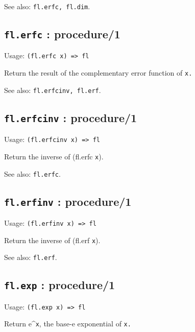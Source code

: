 \documentclass[
]{article}
\newcommand{\passthrough}[1]{#1}
\begin{document}
See also: \passthrough{\lstinline!fl.erfc, fl.dim!}.

\hypertarget{fl.erfc-procedure1-1}{%
\subsection{\texorpdfstring{\texttt{fl.erfc} :
procedure/1}{fl.erfc : procedure/1}}\label{fl.erfc-procedure1-1}}

Usage: \passthrough{\lstinline!(fl.erfc x) => fl!}

Return the result of the complementary error function of
\passthrough{\lstinline!x.!}

See also: \passthrough{\lstinline!fl.erfcinv, fl.erf!}.

\hypertarget{fl.erfcinv-procedure1-1}{%
\subsection{\texorpdfstring{\texttt{fl.erfcinv} :
procedure/1}{fl.erfcinv : procedure/1}}\label{fl.erfcinv-procedure1-1}}

Usage: \passthrough{\lstinline!(fl.erfcinv x) => fl!}

Return the inverse of (fl.erfc \passthrough{\lstinline!x!}).

See also: \passthrough{\lstinline!fl.erfc!}.

\hypertarget{fl.erfinv-procedure1-1}{%
\subsection{\texorpdfstring{\texttt{fl.erfinv} :
procedure/1}{fl.erfinv : procedure/1}}\label{fl.erfinv-procedure1-1}}

Usage: \passthrough{\lstinline!(fl.erfinv x) => fl!}

Return the inverse of (fl.erf \passthrough{\lstinline!x!}).

See also: \passthrough{\lstinline!fl.erf!}.

\hypertarget{fl.exp-procedure1-1}{%
\subsection{\texorpdfstring{\texttt{fl.exp} :
procedure/1}{fl.exp : procedure/1}}\label{fl.exp-procedure1-1}}

Usage: \passthrough{\lstinline!(fl.exp x) => fl!}

Return e\^{}\passthrough{\lstinline!x!}, the base-e exponential of
\passthrough{\lstinline!x.!}
\end{document}
